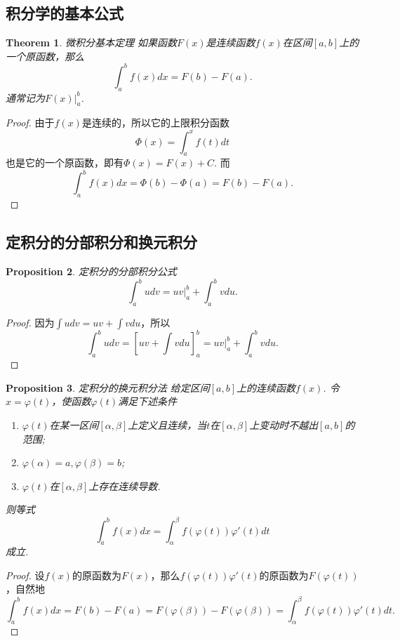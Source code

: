 \documentclass{article}
\newtheorem{theorem}{Theorem}[section]
\newtheorem{proposition}[theorem]{Proposition}
\begin{document}
\subsection{积分学的基本公式}

\begin{theorem}
\rm {\color{red} 微积分基本定理} 如果函数$F(x)$是连续函数$f(x)$在区间$[a,b]$上的一个原函数，那么
$$
\int_a^b f(x)dx = F(b)-F(a).
$$
通常记为$F(x)\rvert_a^b$.
\end{theorem}

\begin{proof}
由于$f(x)$是连续的，所以它的上限积分函数
$$
\Phi(x) =\int_a^x f(t)dt
$$
也是它的一个原函数，即有$\Phi(x) = F(x)+C$. 而
$$
\int_a^b f(x)dx  = \Phi(b) - \Phi(a) = F(b)-F(a).
$$
\end{proof}

\subsection{定积分的分部积分和换元积分}


\begin{proposition}
\rm {\color{red}定积分的分部积分公式}
$$
\int_a^b udv = uv\rvert_a^b + \int_a^b vd u.  
$$
\end{proposition}

\begin{proof}
因为$\int udv = uv + \int vdu$，所以
$$
\int_a^b udv = \left[ uv + \int vdu \right]_a^b = uv\rvert_a^b + \int_a^b vdu.
$$
\end{proof}


\begin{proposition}
\rm {\color{red}定积分的换元积分法}
给定区间$[a,b]$上的连续函数$f(x)$. 令$x = \varphi(t)$，使函数$\varphi(t)$满足下述条件
\begin{enumerate}
	\item $\varphi(t)$在某一区间$[\alpha,\beta]$上定义且连续，当$t$在$[\alpha,\beta]$上变动时不越出$[a,b]$的范围;
	\item $\varphi(\alpha)=a,\varphi(\beta)=b$;
	\item $\varphi(t)$在$[\alpha,\beta]$上存在连续导数.
\end{enumerate}
则等式
$$
\int_a^b f(x)dx = \int_\alpha^{\beta} f(\varphi(t))\varphi'(t)dt
$$
成立.
\end{proposition}

\begin{proof}
设$f(x)$的原函数为$F(x)$，那么$f(\varphi(t))\varphi'(t)$的原函数为$F(\varphi(t))$，自然地
$$
\int_a^b f(x)dx = F(b)-F(a) = F(\varphi(\beta))-F(\varphi(\beta)) = \int_\alpha^{\beta} f(\varphi(t))\varphi'(t)dt.
$$
\end{proof}
\end{document}
